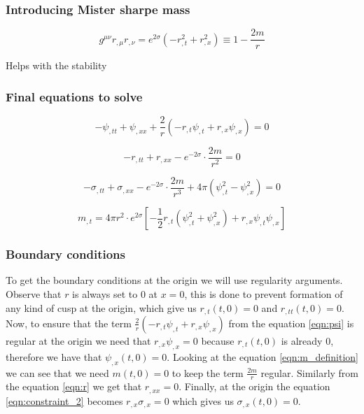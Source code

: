 \documentclass[hyperref={bookmarks=false},aspectratio=169]{beamer}
\begin{document}
\begin{frame}
  \frametitle{Introducing Mister sharpe mass}
  \begin{equation*}
    g^{\mu \nu} r_{, \mu} r_{, \nu}=e^{2 \sigma}\left(-r_{, t}^{2}+r_{, x}^{2}\right) \equiv 1-\frac{2 m}{r}
  \end{equation*}

  Helps with the stability


\end{frame}


\begin{frame}
  \frametitle{Final equations to solve}

  \begin{equation}
    -\psi_{, t t}+\psi_{, x x}+\frac{2}{r}\left(-r_{, t} \psi_{, t}+r_{, x} \psi_{, x}\right)=0
    \label{eqn:psi}
  \end{equation}

  \begin{equation}
    -r_{, t t}+r_{, x x}-e^{-2 \sigma} \cdot \frac{2 m}{r^{2}}=0
    \label{eqn:r}
  \end{equation}

  \begin{equation}
    -\sigma_{, t t}+\sigma_{, x x}-e^{-2 \sigma} \cdot \frac{2 m}{r^{3}}+4 \pi\left(\psi_{, t}^{2}-\psi_{, x}^{2}\right)=0
    \label{eqn:sigma}
  \end{equation}

  \begin{equation}
    m_{, t}=4 \pi r^{2} \cdot e^{2 \sigma}\left[-\frac{1}{2} r_{, t}\left(\psi_{, t}^{2}+\psi_{, x}^{2}\right)+r_{, x} \psi_{, t} \psi_{, x}\right]
    \label{eqn:m_t}
  \end{equation}


\end{frame}

\begin{frame}
  \frametitle{Boundary conditions}
  To get the boundary conditions at the origin we will use regularity arguments.
  Observe that $r$ is always set to $0$ at $x=0$, this is done to prevent formation of any kind of cusp at the origin, which give us $r_{,t}(t,0) = 0$ and $r_{,tt}(t,0)=0$.
  Now, to ensure that the term $\frac{2}{r}\left(-r_{, t} \psi_{, t}+r_{, x} \psi_{, x}\right)$ from the equation \ref{eqn:psi} is regular at the origin we need that $r_{, x} \psi_{, x} = 0$ because $r_{,t}(t,0)$ is already $0$, therefore we have that $\psi_{,x}(t,0) = 0$. Looking at the equation \ref{eqn:m_definition} we can see that we need $m(t,0) = 0 $ to keep the term $\frac{2 m}{r}$ regular. Similarly from the equation \ref{eqn:r} we get that $r_{,xx}=0$. Finally, at the origin the equation \ref{eqn:constraint_2} becomes $r_{,x} \sigma_{,x} = 0$ which gives us $\sigma_{,x}(t,0) = 0$.

\end{frame}
\end{document}

